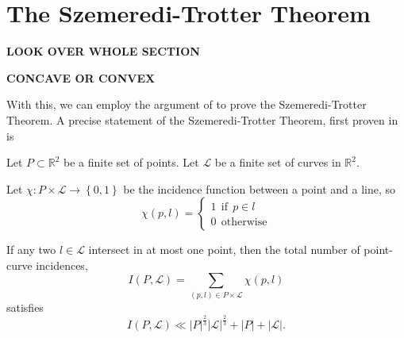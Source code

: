 \documentclass[12pt,reqno]{amsart}
\begin{document}
\section{The Szemeredi-Trotter Theorem}

\textbf{LOOK OVER WHOLE SECTION}

\textbf{CONCAVE OR CONVEX}

With this, we can employ the argument of \cite{szekely-SzT} to prove the Szemeredi-Trotter Theorem.
A precise statement of the Szemeredi-Trotter Theorem, first proven in \cite{SzT-original} is

\begin{theorem}
Let \(P \subset \mathbb{R} ^{2}\) be a finite set of points. Let \(\mathcal{L} \) be a finite set of curves in \(\mathbb{R} ^{2}\). 

Let \(\chi : P \times \mathcal{L}  \to \left\{ 0,1 \right\} \) be the incidence function
between a point and a line, so
\[
\chi(p,l) = 
\begin{cases}
1 ~ ~ \text{if} ~ ~ p\in l\\
0 ~ ~ \text{otherwise} 
\end{cases}
\]

If any two \( l \in \mathcal{L} \) intersect in at most one point,
then the total number of point-curve incidences,
\[
    I(P, \mathcal{L} ) = \sum _{(p,l)\in P \times \mathcal{L} } \chi(p,l)
\]
satisfies
\[
    I(P,\mathcal{L} ) \ll  \left\lvert P \right\rvert^{\frac{2}{3} } \left\lvert \mathcal{L}  \right\rvert ^{\frac{2}{3} } + \left\lvert P \right\rvert + \left\lvert \mathcal{L}  \right\rvert 
.\]
\end{theorem}
\end{document}
